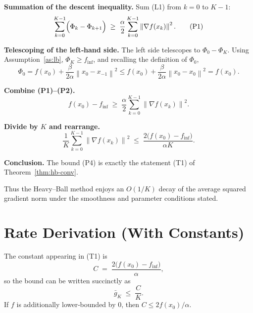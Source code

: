 \documentclass{article}
\newcommand{\norm}[1]{\left\|#1\right\|}
\newcommand{\grad}{\nabla}
\begin{document}
\begin{enumerate}[label={[\arabic*]}]
\item \textbf{Summation of the descent inequality.}  
   Sum (L1) from $k=0$ to $K-1$:
   \[
       \sum_{k=0}^{K-1}\Bigl(\Phi_{k}-\Phi_{k+1}\Bigr)
       \;\ge\; \frac{\alpha}{2}\sum_{k=0}^{K-1}\norm{\grad f(x_{k})}^{2}.
       \tag{P1}
   \]
\item \textbf{Telescoping of the left‑hand side.}  
   The left side telescopes to $\Phi_{0}-\Phi_{K}$.
   Using Assumption~\ref{as:lb}, $\Phi_{K}\ge f_{\inf}$, and recalling the definition of $\Phi_{0}$,
   \[
       \Phi_{0}=f(x_{0})+\frac{\beta}{2\alpha}\norm{x_{0}-x_{-1}}^{2}
               \le f(x_{0})+\frac{\beta}{2\alpha}\norm{x_{0}-x_{0}}^{2}=f(x_{0}).
       \tag{P2}
   \]
\item \textbf{Combine (P1)–(P2).}  
   \[
       f(x_{0})-f_{\inf}\;\ge\;\frac{\alpha}{2}\sum_{k=0}^{K-1}\norm{\grad f(x_{k})}^{2}.
       \tag{P3}
   \]
\item \textbf{Divide by $K$ and rearrange.}  
   \[
       \frac{1}{K}\sum_{k=0}^{K-1}\norm{\grad f(x_{k})}^{2}
       \;\le\; \frac{2\bigl(f(x_{0})-f_{\inf}\bigr)}{\alpha K}.
       \tag{P4}
   \]
\item \textbf{Conclusion.}  
   The bound (P4) is exactly the statement (T1) of Theorem~\ref{thm:hb-conv}.
\end{enumerate}
Thus the Heavy–Ball method enjoys an $O(1/K)$ decay of the average squared gradient norm under the smoothness and parameter conditions stated.

\section*{Rate Derivation (With Constants)}
The constant appearing in (T1) is
\[
    C\;=\;\frac{2\bigl(f(x_{0})-f_{\inf}\bigr)}{\alpha},
\]
so the bound can be written succinctly as
\[
    \bar{g}_{K}\;\le\; \frac{C}{K}.
\]
If $f$ is additionally lower‑bounded by $0$, then $C\le 2f(x_{0})/\alpha$.
\end{document}
